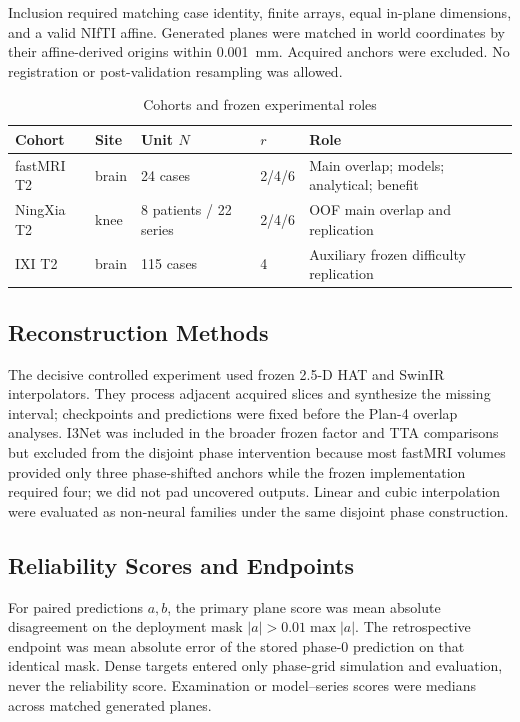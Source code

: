 \documentclass[journal,10pt]{IEEEtran}
\begin{document}
Inclusion required matching case identity, finite arrays, equal in-plane dimensions, and a valid NIfTI affine. Generated planes were matched in world coordinates by their affine-derived origins within 0.001~mm. Acquired anchors were excluded. No registration or post-validation resampling was allowed.

\begin{table}[t]
\caption{Cohorts and frozen experimental roles}
\label{tab:data}\centering
\begin{tabular}{p{1.05cm}p{.72cm}p{1.25cm}p{.58cm}p{2.3cm}}
\toprule
Cohort & Site & Unit $N$ & $r$ & Role \\
\midrule
fastMRI T2 & brain & 24 cases & 2/4/6 & Main overlap; models; analytical; benefit \\
NingXia T2 & knee & 8 patients / 22 series & 2/4/6 & OOF main overlap and replication \\
IXI T2 & brain & 115 cases & 4 & Auxiliary frozen difficulty replication \\
\bottomrule
\end{tabular}
\end{table}

\subsection{Reconstruction Methods}
The decisive controlled experiment used frozen 2.5-D HAT and SwinIR interpolators. They process adjacent acquired slices and synthesize the missing interval; checkpoints and predictions were fixed before the Plan-4 overlap analyses. I3Net was included in the broader frozen factor and TTA comparisons but excluded from the disjoint phase intervention because most fastMRI volumes provided only three phase-shifted anchors while the frozen implementation required four; we did not pad uncovered outputs. Linear and cubic interpolation were evaluated as non-neural families under the same disjoint phase construction.

\subsection{Reliability Scores and Endpoints}
For paired predictions $a,b$, the primary plane score was mean absolute disagreement on the deployment mask $|a|>0.01\max|a|$. The retrospective endpoint was mean absolute error of the stored phase-0 prediction on that identical mask. Dense targets entered only phase-grid simulation and evaluation, never the reliability score. Examination or model--series scores were medians across matched generated planes.
\end{document}

